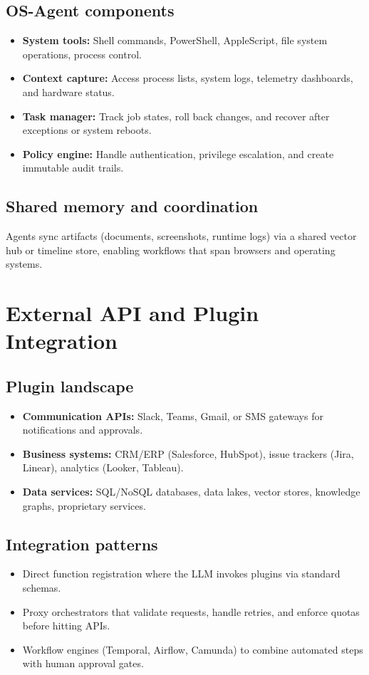 \documentclass{article}
\begin{document}
\subsection{OS-Agent components}
\begin{itemize}
  \item \textbf{System tools:} Shell commands, PowerShell, AppleScript, file system operations, process control.
  \item \textbf{Context capture:} Access process lists, system logs, telemetry dashboards, and hardware status.
  \item \textbf{Task manager:} Track job states, roll back changes, and recover after exceptions or system reboots.
  \item \textbf{Policy engine:} Handle authentication, privilege escalation, and create immutable audit trails.
\end{itemize}

\subsection{Shared memory and coordination}
Agents sync artifacts (documents, screenshots, runtime logs) via a shared vector hub or timeline store, enabling workflows that span browsers and operating systems.

\section{External API and Plugin Integration}
\subsection{Plugin landscape}
\begin{itemize}
  \item \textbf{Communication APIs:} Slack, Teams, Gmail, or SMS gateways for notifications and approvals.
  \item \textbf{Business systems:} CRM/ERP (Salesforce, HubSpot), issue trackers (Jira, Linear), analytics (Looker, Tableau).
  \item \textbf{Data services:} SQL/NoSQL databases, data lakes, vector stores, knowledge graphs, proprietary services.
\end{itemize}

\subsection{Integration patterns}
\begin{itemize}
  \item Direct function registration where the LLM invokes plugins via standard schemas.
  \item Proxy orchestrators that validate requests, handle retries, and enforce quotas before hitting APIs.
  \item Workflow engines (Temporal, Airflow, Camunda) to combine automated steps with human approval gates.
\end{itemize}
\end{document}
